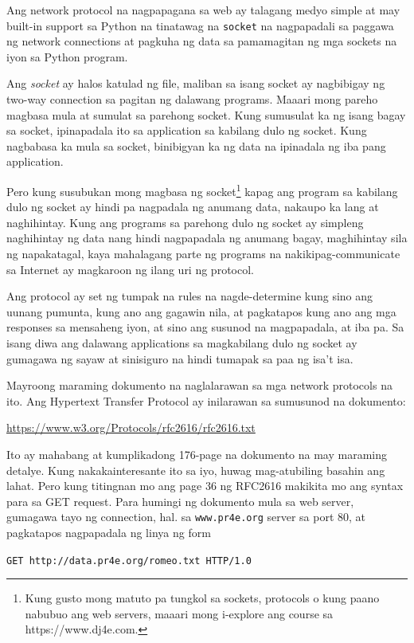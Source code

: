 \documentclass[10pt,]{book}
\begin{document}
Ang network protocol na nagpapagana sa web ay talagang medyo simple at
may built-in support sa Python na tinatawag na \texttt{socket} na
nagpapadali sa paggawa ng network connections at pagkuha ng data sa
pamamagitan ng mga sockets na iyon sa Python program.

Ang \emph{socket} ay halos katulad ng file, maliban sa isang socket ay
nagbibigay ng two-way connection sa pagitan ng dalawang programs. Maaari
mong pareho magbasa mula at sumulat sa parehong socket. Kung sumusulat
ka ng isang bagay sa socket, ipinapadala ito sa application sa kabilang
dulo ng socket. Kung nagbabasa ka mula sa socket, binibigyan ka ng data
na ipinadala ng iba pang application.

Pero kung susubukan mong magbasa ng socket\footnote{Kung gusto mong
  matuto pa tungkol sa sockets, protocols o kung paano nabubuo ang web
  servers, maaari mong i-explore ang course sa https://www.dj4e.com.}
kapag ang program sa kabilang dulo ng socket ay hindi pa nagpadala ng
anumang data, nakaupo ka lang at naghihintay. Kung ang programs sa
parehong dulo ng socket ay simpleng naghihintay ng data nang hindi
nagpapadala ng anumang bagay, maghihintay sila ng napakatagal, kaya
mahalagang parte ng programs na nakikipag-communicate sa Internet ay
magkaroon ng ilang uri ng protocol.

Ang protocol ay set ng tumpak na rules na nagde-determine kung sino ang
uunang pumunta, kung ano ang gagawin nila, at pagkatapos kung ano ang
mga responses sa mensaheng iyon, at sino ang susunod na magpapadala, at
iba pa. Sa isang diwa ang dalawang applications sa magkabilang dulo ng
socket ay gumagawa ng sayaw at sinisiguro na hindi tumapak sa paa ng
isa't isa.

Mayroong maraming dokumento na naglalarawan sa mga network protocols na
ito. Ang Hypertext Transfer Protocol ay inilarawan sa sumusunod na
dokumento:

\url{https://www.w3.org/Protocols/rfc2616/rfc2616.txt}

Ito ay mahabang at kumplikadong 176-page na dokumento na may maraming
detalye. Kung nakakainteresante ito sa iyo, huwag mag-atubiling basahin
ang lahat. Pero kung titingnan mo ang page 36 ng RFC2616 makikita mo ang
syntax para sa GET request. Para humingi ng dokumento mula sa web
server, gumagawa tayo ng connection, hal. sa \texttt{www.pr4e.org}
server sa port 80, at pagkatapos nagpapadala ng linya ng form

\texttt{GET\ http://data.pr4e.org/romeo.txt\ HTTP/1.0}
\end{document}
